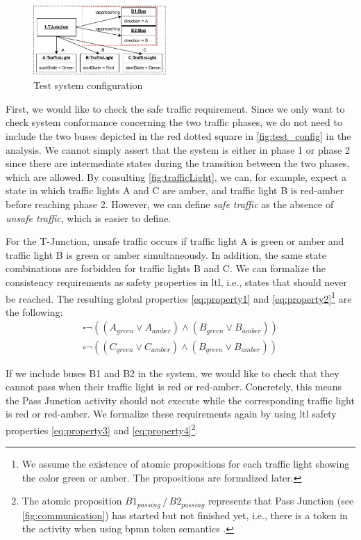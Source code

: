 \documentclass{jot}
\begin{document}
\begin{figure}[h]
    \centering
    \includegraphics[width=0.45\textwidth]{figures/test_config.pdf}
    \caption{Test system configuration}
    \label{fig:test_config}
\end{figure}

First, we would like to check the safe traffic requirement.
Since we only want to check system conformance concerning the two traffic phases, we do not need to include the two buses depicted in the red dotted square in \autoref{fig:test_config} in the analysis.
We cannot simply assert that the system is either in phase 1 or phase 2 since there are intermediate states during the transition between the two phases, which are allowed.
By consulting \autoref{fig:trafficLight}, we can, for example, expect a state in which traffic lights A and C are amber, and traffic light B is red-amber before reaching phase 2.
However, we can define \emph{safe traffic} as the absence of \emph{unsafe traffic}, which is easier to define.

For the T-Junction, unsafe traffic occurs if traffic light A is green or amber and traffic light B is green or amber simultaneously.
In addition, the same state combinations are forbidden for traffic lights B and C.
We can formalize the consistency requirements as safety properties in \gls*{ltl}, i.e., states that should never be reached.
The resulting global properties \ref{eq:property1} and \ref{eq:property2}\footnote{We assume the existence of atomic propositions for each traffic light showing the color green or amber. The propositions are formalized later.} are the following:
\begin{align}
    \square\neg((A_{green} \lor A_{amber}) \land (B_{green} \lor B_{amber})) \label{eq:property1} \\
    \square\neg((C_{green} \lor C_{amber}) \land (B_{green} \lor B_{amber})) \label{eq:property2}
\end{align}

If we include buses \textsf{B1} and \textsf{B2} in the system, we would like to check that they cannot pass when their traffic light is red or red-amber.
Concretely, this means the \textsf{Pass Junction} activity should not execute while the corresponding traffic light is \textsf{red} or \textsf{red-amber}.
We formalize these requirements again by using \gls*{ltl} safety properties \ref{eq:property3} and \ref{eq:property4}\footnote{The atomic proposition $B1_{passing}\, / \,B2_{passing}$ represents that \textsf{Pass Junction} (see \autoref{fig:communication}) has started but not finished yet, i.e., there is a token in the activity when using \gls*{bpmn} token semantics \cite{objectmanagementgroupBusinessProcessModel2013}.}.
\end{document}
